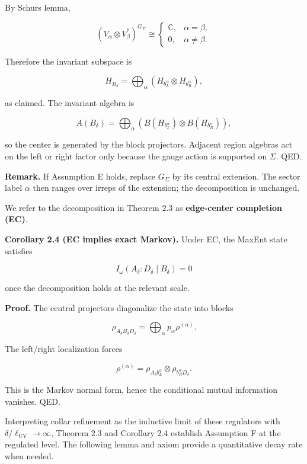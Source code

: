 By Schur\textquotesingle s lemma,

\[
(V_\alpha \otimes V_\beta^*)^{G_\Sigma}
\cong
\begin{cases}
\mathbb C, & \alpha=\beta,\\
0, & \alpha\ne\beta.
\end{cases}
\]

Therefore the invariant subspace is

\[
H_{B_\delta} = \bigoplus_\alpha (H_{b_L^\alpha} \otimes H_{b_R^\alpha}),
\]

as claimed. The invariant algebra is

\[
A(B_\delta) = \bigoplus_\alpha
(B(H_{b_L^\alpha}) \otimes B(H_{b_R^\alpha})),
\]

so the center is generated by the block projectors. Adjacent region algebras act on the left or right factor only because the gauge action is supported on \(\Sigma\). QED.

\textbf{Remark.} If Assumption E holds, replace \(G_\Sigma\) by its central extension. The sector label \(\alpha\) then ranges over irreps of the extension; the decomposition is unchanged.

We refer to the decomposition in Theorem 2.3 as \textbf{edge-center completion (EC)}.

\textbf{Corollary 2.4 (EC implies exact Markov).} Under EC, the MaxEnt state satisfies

\[
I_\omega(A_\delta:D_\delta \mid B_\delta) = 0
\]

once the decomposition holds at the relevant scale.

\textbf{Proof.} The central projectors diagonalize the state into blocks

\[
\rho_{A_\delta B_\delta D_\delta}
= \bigoplus_\alpha p_\alpha \rho^{(\alpha)}.
\]

The left/right localization forces

\[
\rho^{(\alpha)} =
\rho_{A_\delta b_L^\alpha} \otimes \rho_{b_R^\alpha D_\delta}.
\]

This is the Markov normal form, hence the conditional mutual information vanishes. QED.

Interpreting collar refinement as the inductive limit of these regulators with \(\delta/\ell_{\mathrm{UV}} \to \infty\), Theorem 2.3 and Corollary 2.4 establish Assumption F at the regulated level. The following lemma and axiom provide a quantitative decay rate when needed.

